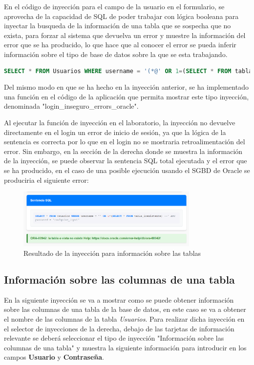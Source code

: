 \documentclass[a4paper,12pt]{article}
\begin{document}
En el código de inyección para el campo de la usuario en el formulario, 
se aprovecha de la capacidad de SQL de poder trabajar con lógica booleana para inyectar la busqueda de la información de una tabla
que se sospecha que no exista, para forzar al sistema que devuelva un error y muestre la información del error que se ha producido,
lo que hace que al conocer el error se pueda inferir información sobre el tipo de base de datos sobre la que se esta trabajando.

\begin{lstlisting}[language=SQL]
    SELECT * FROM Usuarios WHERE username = '(*@' OR 1=(SELECT * FROM tabla\_inexistente) --@*)' AND password = '(*@cualquier\_input@*)'
\end{lstlisting}

Del mismo modo en que se ha hecho en la inyección anterior, 
se ha implementado una función en el código de la aplicación que permita mostrar este tipo inyección, denominada "login\_inseguro\_errors\_oracle".

Al ejecutar la función de inyección en el laboratorio, la inyección no devuelve directamente en el login un error de inicio de sesión,
ya que la lógica de la sentencia es correcta por lo que en el login no se mostraria retroalimentación del error. Sin embargo,
en la sección de la derecha donde se muestra la información de la inyección, se puede observar la sentencia SQL total ejecutada y el error que se ha producido,
en el caso de una posible ejecución usando el SGBD de Oracle se produciria el siguiente error:

\begin{figure}[H]
    \centering
    \includegraphics[width=0.8\textwidth]{Imagenes/error6.png}
    \caption{Resultado de la inyección para información sobre las tablas}
\end{figure}

\subsection{Información sobre las columnas de una tabla}

En la siguiente inyección se va a mostrar como se puede obtener información sobre las columnas de una tabla de la base de datos,
en este caso se va a obtener el nombre de las columnas de la tabla \textit{Usuarios}.
Para realizar dicha inyección en el selector de inyecciones de la derecha,
debajo de las tarjetas de información relevante se deberá seleccionar el tipo de inyección "Información sobre las columnas de una tabla"
y muestra la siguiente información para introducir en los campos \textbf{Usuario} y \textbf{Contraseña}.
\end{document}
